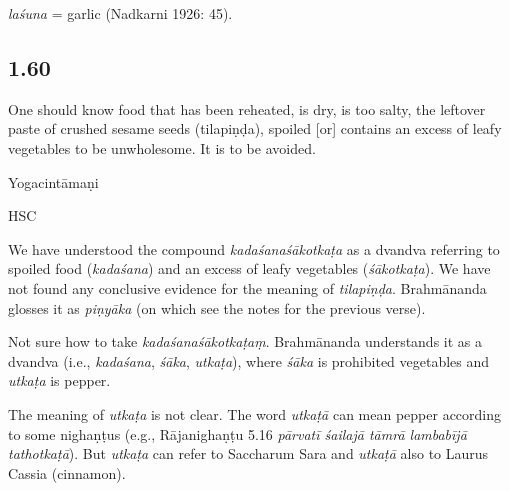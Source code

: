 \begin{ekdosis}
\begin{philcomm}[hp01_059]
\emph{laśuna} = garlic (Nadkarni 1926: 45).
\end{philcomm}

\subsection*{1.60}
\begin{translation}[hp01_060]
One should know food that has been reheated, is dry, is too salty, the leftover paste of crushed sesame seeds (tilapiṇḍa), spoiled [or] contains an excess of leafy vegetables to be unwholesome. It is to be avoided.
\end{translation}

\begin{sources}[hp01_060]
\end{sources}

\begin{testimonia}[hp01_060]
Yogacintāmaṇi

\begin{versinnote}
\end{versinnote}

HSC

\begin{versinnote}
\end{versinnote}

\end{testimonia}

\begin{philcomm}[hp01_060]
We have understood the compound \emph{kadaśanaśākotkaṭa} as a dvandva referring to spoiled food (\emph{kadaśana}) and an excess of leafy vegetables (\emph{śākotkaṭa}).
We have not found any conclusive evidence for the meaning of \emph{tilapiṇḍa}. Brahmānanda glosses it as \emph{piṇyāka} (on which see the notes for the previous verse).

Not sure how to take \emph{kadaśanaśākotkaṭaṃ}. Brahmānanda understands it as a dvandva (i.e., \emph{kadaśana}, \emph{śāka}, \emph{utkaṭa}), where \emph{śāka} is prohibited vegetables and \emph{utkaṭa} is pepper.

The meaning of \emph{utkaṭa} is not clear. The word \emph{utkaṭā} can mean pepper according to some nighaṇṭus (e.g., Rājanighaṇṭu 5.16 \emph{pārvatī śailajā tāmrā lambabījā tathotkaṭā}). But \emph{utkaṭa} can refer to Saccharum Sara and \emph{utkaṭā} also to Laurus Cassia (cinnamon).


\end{philcomm}
\end{ekdosis}
